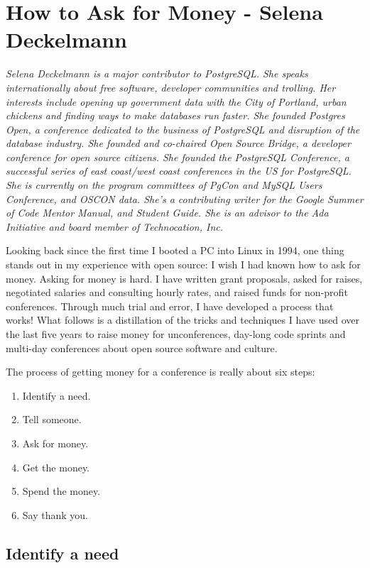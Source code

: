 \chapter{How to Ask for Money - Selena Deckelmann}

\textit{Selena Deckelmann is a major contributor to PostgreSQL. She speaks
internationally about free software, developer communities and trolling. Her
interests include opening up government data with the City of Portland, urban
chickens and finding ways to make databases run faster.
\newline
She founded Postgres Open, a conference
dedicated to the business of PostgreSQL and disruption of the database industry.
She founded and co-chaired Open Source Bridge, a developer conference
for open source citizens. She founded the PostgreSQL Conference, a successful
series of east coast/west coast conferences in the US for PostgreSQL. She is
currently on the program committees of PgCon and MySQL Users Conference, and
OSCON data. She's a contributing writer for the Google Summer of Code Mentor
Manual, and Student Guide. She is an advisor to the Ada Initiative and board
member of Technocation, Inc.}

Looking back since the first time I booted a PC into Linux in 1994, one thing
stands out in my experience with open source: I wish I had known how to
ask for money.
Asking for money is hard. I have written grant proposals, asked for raises,
negotiated salaries and consulting hourly rates, and raised funds for non-profit
conferences. Through much trial and error, I have developed a process that
works!
What follows is a distillation of the tricks and techniques I have used over the
last five years to raise money for unconferences, day-long code sprints and
multi-day conferences about open source software and culture.

The process of getting money for a conference is really about six steps: 
\begin{enumerate}
 \item Identify a need. 
 \item Tell someone. 
 \item Ask for money.
 \item Get the money.
 \item Spend the money. 
 \item Say thank you.
\end{enumerate}

\section*{Identify a need}

